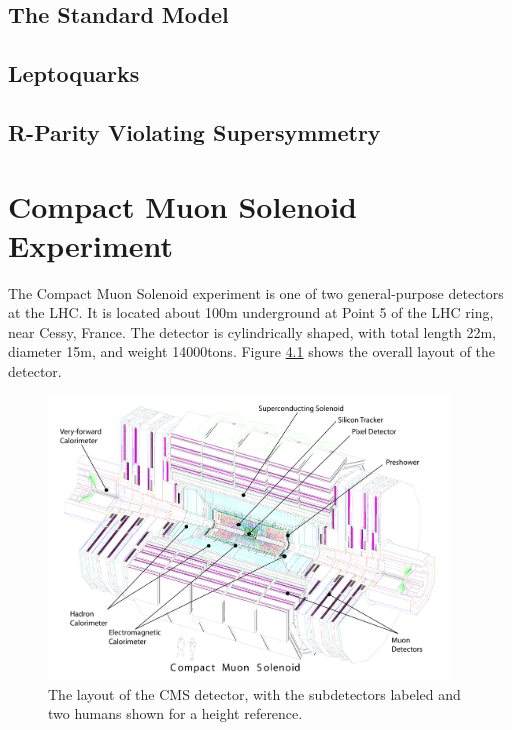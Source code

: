 \documentclass[12pt]{thesis}  %
\begin{document}
\setcounter{section}{-1}

\section{The Standard Model}

\section{Leptoquarks}

\section{R-Parity Violating Supersymmetry}
\chapter{Compact Muon Solenoid Experiment
\label{ch:cmsexperiment}}
\setcounter{section}{-1}

The Compact Muon Solenoid experiment is one of two general-purpose detectors at the LHC. It is located about 100\unit{m} underground at Point 5 of the LHC ring, near Cessy, France. The detector is cylindrically shaped, with total length 22\unit{m}, diameter 15\unit{m}, and weight 14000\unit{tons}. Figure \ref{fig:cms-overall} shows the overall layout of the detector.

\begin{figure}[hbt]
\begin{center}
\includegraphics[width=0.95\textwidth]{figures/cms_complete_labelled.pdf}
\caption{The layout of the CMS detector, with the subdetectors labeled and two humans shown for a height reference.}
\label{fig:cms-overall}
\end{center}
\end{figure}
\end{document}
